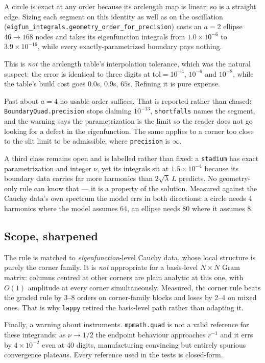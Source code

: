 \documentclass[11pt]{article}
\theoremstyle{remark}
\begin{document}
\noindent
A circle is exact at any order because its arclength map is linear; so is a straight
edge. Sizing each segment on this identity as well as on the oscillation
(\verb|eigfun_integrals.geometry_order_for_precision|) costs an $a=2$ ellipse
$46\to168$ nodes and takes its eigenfunction integrals from $1.0\times10^{-6}$ to
$3.9\times10^{-16}$, while every exactly-parametrized boundary pays nothing.

This is \emph{not} the arclength table's interpolation tolerance, which was the
natural suspect: the error is identical to three digits at $\mathrm{tol}=10^{-4}$,
$10^{-6}$ and $10^{-8}$, while the table's build cost goes $0.0$s, $0.9$s, $65$s.
Refining it is pure expense.

Past about $a=4$ no usable order suffices. That is reported rather than chased:
\verb|BoundaryQuad.precision| stops claiming $10^{-13}$, \verb|shortfalls| names the
segment, and the warning says the parametrization is the limit so the reader does
not go looking for a defect in the eigenfunction. The same applies to a corner too
close to the slit limit to be admissible, where \verb|precision| is $\infty$.

A third class remains open and is labelled rather than fixed: a \verb|stadium| has
exact parametrization and integer $\nu$, yet its integrals sit at $1.5\times10^{-4}$
because its boundary data carries far more harmonics than $2\sqrt\lambda\,L$
predicts. No geometry-only rule can know that --- it is a property of the solution.
Measured against the Cauchy data's own spectrum the model errs in both directions:
a circle needs 4 harmonics where the model assumes 64, an ellipse needs 80 where it
assumes 8.

\subsection{Scope, sharpened}

The rule is matched to \emph{eigenfunction}-level Cauchy data, whose local
structure is purely the corner family. It is \emph{not} appropriate for a
basis-level $N\times N$ Gram matrix: columns centred at other corners are plain
analytic at this one, with $O(1)$ amplitude at every corner simultaneously.
Measured, the corner rule beats the graded rule by 3--8 orders on corner-family
blocks and loses by 2--4 on mixed ones. That is why \verb|lappy| retired the
basis-level path rather than adapting it.

Finally, a warning about instruments. \verb|mpmath.quad| is not a valid reference
for these integrands: as $\nu\to1/2$ the endpoint behaviour approaches $r^{-1}$
and it errs by $4\times10^{-2}$ even at 40 digits, manufacturing convincing but
entirely spurious convergence plateaus. Every reference used in the tests is
closed-form.
\end{document}
